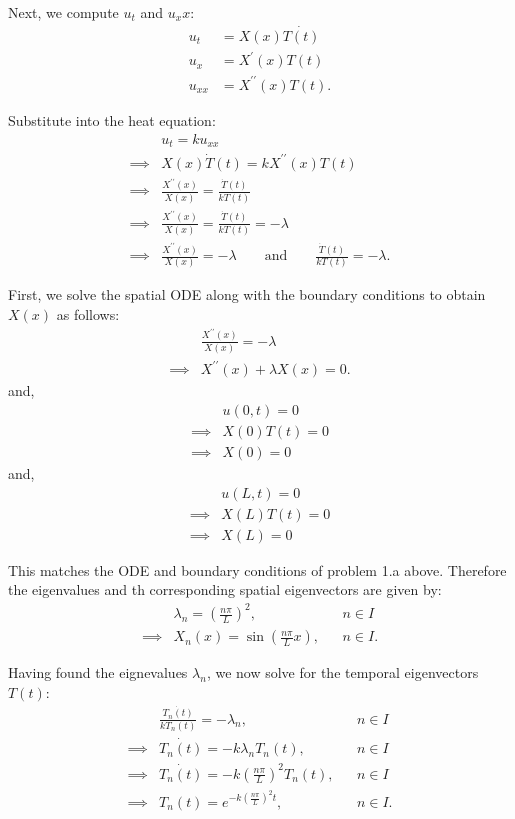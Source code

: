 \documentclass{article}
\begin{document}
\noindent
Next, we compute $u_t$ and $u_xx$:
\begin{align*}
  u_t &= X(x) \dot{T(t)} \\
  u_x &= X^{\prime}(x) T(t) \\
  u_{xx} &= X^{\prime\prime}(x) T(t).
\end{align*}

\noindent
Substitute into the heat equation:
\begin{align*}
  &u_t = ku_{xx} \\
  \implies&X(x) \dot{T}(t) = k X^{\prime\prime}(x) T(t) \\
  \implies& \frac{X^{\prime\prime}(x)}{X(x)} = \frac{\dot{T}(t)}{kT(t)} \\
  \implies& \frac{X^{\prime\prime}(x)}{X(x)} = \frac{\dot{T}(t)}{kT(t)} = -\lambda \\
  \implies& \frac{X^{\prime\prime}(x)}{X(x)} = -\lambda \qquad \text{and} \qquad \frac{\dot{T}(t)}{kT(t)} = -\lambda.
\end{align*}

\noindent
First, we solve the spatial ODE along with the boundary conditions to obtain $X(x)$ as follows:
\begin{align*}
  &\frac{X^{\prime\prime}(x)}{X(x)} = -\lambda \\
  \implies& X^{\prime\prime}(x) + \lambda X(x) = 0.
\end{align*}
and,
\begin{align*}
  &u(0, t) = 0 \\
  \implies& X(0)T(t) = 0 \\
  \implies& X(0) = 0
\end{align*}
and,
\begin{align*}
  &u(L, t) = 0 \\
  \implies& X(L)T(t) = 0 \\
  \implies& X(L) = 0
\end{align*}

\noindent
This matches the ODE and boundary conditions of problem 1.a above. Therefore the eigenvalues and th corresponding spatial eigenvectors are given by:
\begin{align*}
  &\lambda_n = \left(\frac{n \pi }{L}\right)^2, &&n \in I \\
  \implies&X_n(x) = \sin\left(\frac{n \pi }{L} x\right), &&n \in I.
\end{align*}

\noindent
Having found the eignevalues $\lambda_n$, we now solve for the temporal eigenvectors $T(t)$:
\begin{align*}
  &\frac{\dot{T_n(t)}}{kT_n(t)} = -\lambda_n, &&n \in I \\
  \implies&\dot{T_n(t)} = -k \lambda_n T_n(t), &&n \in I \\
  \implies&\dot{T_n(t)} = -k \left(\frac{n \pi }{L}\right)^2 T_n(t), &&n \in I \\
  \implies&T_n(t) = e^{-k \left(\frac{n \pi }{L}\right)^2 t}, &&n \in I.
\end{align*}
\end{document}
